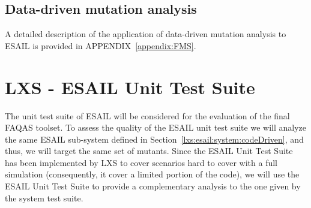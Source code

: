\subsection{Data-driven mutation analysis}


A detailed description of the application of data-driven mutation analysis to ESAIL is provided in APPENDIX~\ref{appendix:FMS}.

\section{LXS - ESAIL Unit Test Suite}
\label{chapter:caseStudies:LXS:Unit}



The unit test suite of ESAIL will be considered for the evaluation of the final FAQAS toolset. 
To assess the quality of the ESAIL unit test suite we will analyze the same ESAIL sub-system defined in Section~\ref{lxs:esail:system:codeDriven}, and thus, we will target the same set of mutants. Since the ESAIL Unit Test Suite has been implemented by LXS to cover scenarios hard to cover with a full simulation (consequently, it cover a limited portion of the code), we will use the ESAIL Unit Test Suite to provide a complementary analysis to the one given by the system test suite.

